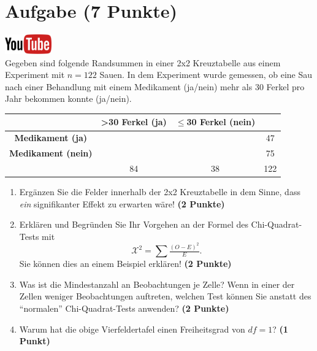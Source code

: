 \documentclass[a4paper, 10pt]{scrartcl}\usepackage[]{graphicx}\usepackage[]{xcolor}
\begin{document}
\section{Aufgabe \hfill (7 Punkte)}

\hfill\href{https://youtu.be/jakM7fHyZfU}{\includegraphics[width =
  2cm]{img/youtube}}\\[1Ex]




Gegeben sind folgende Randsummen in einer 2x2 Kreuztabelle aus einem
Experiment mit $n = 122$ Sauen. In dem Experiment wurde gemessen,
ob eine Sau nach einer Behandlung mit einem Medikament (ja/nein)
mehr als 30 Ferkel pro Jahr bekommen konnte (ja/nein).

\vspace{5Ex}

\begin{center}
  \Large
  \begin{tabular}{c|c|c|c}
     & \textbf{>30 Ferkel (ja)} & \textbf{$\leq$30 Ferkel (nein)} &  \strut\\
    \hline
    \textbf{Medikament (ja)} & \phantom{100}  & \phantom{100}  &   47  \strut\\
    \hline
    \textbf{Medikament (nein)} & \phantom{100}  & \phantom{100}  &   75   \strut\\
    \hline
     &  84 &  38 &  122  \strut\\
  \end{tabular}
\end{center}



\vspace{5Ex}

\begin{enumerate}
\item Erg{\"a}nzen Sie die Felder innerhalb der 2x2 Kreuztabelle in dem Sinne,
  dass \textit{ein} signifikanter Effekt zu erwarten w{\"a}re!
  \textbf{(2 Punkte)}
\item Erkl{\"a}ren und Begr{\"u}nden Sie Ihr Vorgehen an der Formel des
  Chi-Quadrat-Tests mit
  \begin{equation*}
  \mathcal{X}^2 = \sum\tfrac{(O - E)^2}{E}.  
  \end{equation*}
  Sie k{\"o}nnen dies an einem Beispiel erkl{\"a}ren! \textbf{(2 Punkte)}
\item Was ist die Mindestanzahl an Beobachtungen je Zelle? Wenn in einer
  der Zellen weniger Beobachtungen auftreten, welchen Test k{\"o}nnen Sie
  anstatt des "`normalen"' Chi-Quadrat-Tests anwenden? \textbf{(2 Punkte)}
\item Warum hat die obige Vierfeldertafel einen Freiheitsgrad von $df=1$?
  \textbf{(1 Punkt)}
\end{enumerate} 
\clearpage
\end{document}
